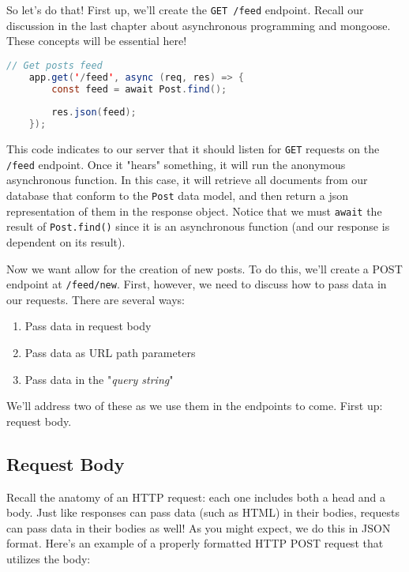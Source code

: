 So let's do that! First up, we'll create the \texttt{GET /feed} endpoint. Recall our discussion in the last chapter about asynchronous programming and mongoose. These concepts will be essential here!

\begin{lstlisting}[language=Java]
    // Get posts feed
    app.get('/feed', async (req, res) => {
        const feed = await Post.find();
    
        res.json(feed);
    });
\end{lstlisting}

This code indicates to our server that it should listen for \texttt{GET} requests on the \texttt{/feed} endpoint. Once it "hears" something, it will run the anonymous asynchronous function. In this case, it will retrieve all documents from our database that conform to the \texttt{Post} data model, and then return a json representation of them in the response object. Notice that we must \texttt{await} the result of \texttt{Post.find()} since it is an asynchronous function (and our response is dependent on its result).

Now we want allow for the creation of new posts. To do this, we'll create a POST endpoint at \texttt{/feed/new}. First, however, we need to discuss how to pass data in our requests. There are several ways:

\begin{enumerate}
    \item Pass data in request body
    \item Pass data as URL path parameters
    \item Pass data in the "\emph{query string}"
\end{enumerate}

We'll address two of these as we use them in the endpoints to come. First up: request body.

\subsection*{Request Body}
Recall the anatomy of an HTTP request: each one includes both a head and a body. Just like responses can pass data (such as HTML) in their bodies, requests can pass data in their bodies as well! As you might expect, we do this in JSON format. Here's an example of a properly formatted HTTP POST request that utilizes the body:

